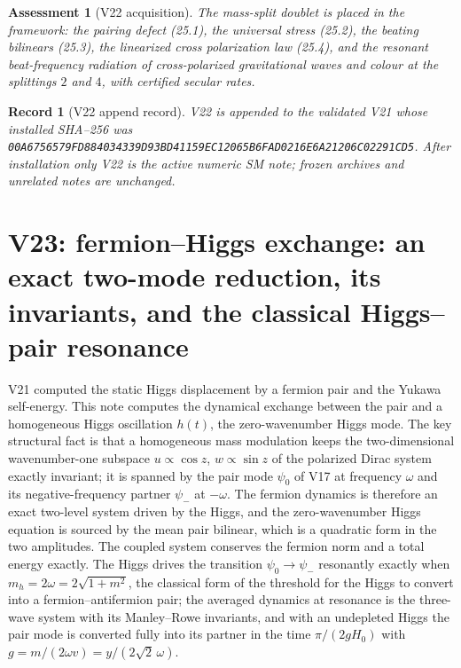 \documentclass[11pt]{article}
\newtheorem{assessment}[theorem]{Assessment}
\newtheorem{record}[theorem]{Record}
\theoremstyle{remark}
\begin{document}
\begin{assessment}[V22 acquisition]
\label{ass:v20v22}
The mass-split doublet is placed in the framework: the pairing
defect (25.1), the universal stress (25.2), the beating bilinears
(25.3), the linearized cross polarization law (25.4), and the resonant
beat-frequency radiation of cross-polarized gravitational waves and
colour at the splittings \(2\) and \(4\), with certified secular rates.
\end{assessment}

\begin{record}[V22 append record]
\label{rec:v20v22}
V22 is appended to the validated V21 whose installed SHA--256 was
\texttt{00A6756579FD884034339D93BD41159EC12065B6FAD0216E6A21206C02291CD5}.
After installation only V22 is the active numeric SM note; frozen
archives and unrelated notes are unchanged.
\end{record}


\section{V23: fermion--Higgs exchange: an exact two-mode reduction, its invariants, and the classical Higgs--pair resonance}
\label{sec:v20v23}

V21 computed the static Higgs displacement by a fermion pair and the
Yukawa self-energy.  This note computes the dynamical exchange
between the pair and a homogeneous Higgs oscillation \(h(t)\), the
zero-wavenumber Higgs mode.  The key structural fact is that a
homogeneous mass modulation keeps the two-dimensional wavenumber-one
subspace \(u\propto\cos z\), \(w\propto\sin z\) of the polarized Dirac
system exactly invariant; it is spanned by the pair mode
\(\psi_0\) of V17 at frequency \(\omega\) and its negative-frequency
partner \(\psi_-\) at \(-\omega\).  The fermion dynamics is therefore an
exact two-level system driven by the Higgs, and the zero-wavenumber
Higgs equation is sourced by the mean pair bilinear, which is a
quadratic form in the two amplitudes.  The coupled system conserves
the fermion norm and a total energy exactly.  The Higgs drives the
transition \(\psi_0\to\psi_-\) resonantly exactly when
\(m_h=2\omega=2\sqrt{1+m^2}\), the classical form of the threshold for
the Higgs to convert into a fermion--antifermion pair; the averaged
dynamics at resonance is the three-wave system with its Manley--Rowe
invariants, and with an undepleted Higgs the pair mode is converted
fully into its partner in the time \(\pi/(2gH_0)\) with
\(g=m/(2\omega v)=y/(2\sqrt2\,\omega)\).
\end{document}
